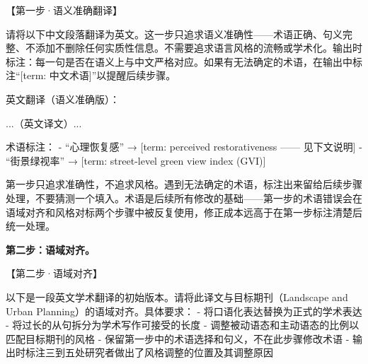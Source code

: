 \begin{userbox}
【第一步·语义准确翻译】

请将以下中文段落翻译为英文。这一步只追求语义准确性——术语正确、句义完整、不添加不删除任何实质性信息。不需要追求语言风格的流畅或学术化。输出时标注：每一句是否在语义上与中文严格对应。如果有无法确定的术语，在输出中标注``[term: 中文术语]''以提醒后续步骤。
\end{userbox}

\begin{aibox}
英文翻译（语义准确版）：

...（英文译文）...

术语标注：
- ``心理恢复感'' → [term: perceived restorativeness —— 见下文说明]
- ``街景绿视率'' → [term: street-level green view index (GVI)]
\end{aibox}

\begin{critiquebox}
第一步只追求准确性，不追求风格。遇到无法确定的术语，标注出来留给后续步骤处理，不要猜测一个填入。术语是后续所有修改的基础——第一步的术语错误会在语域对齐和风格对标两个步骤中被反复使用，修正成本远高于在第一步标注清楚后统一处理。
\end{critiquebox}

\medskip
\textbf{第二步：语域对齐。}

\begin{userbox}
【第二步·语域对齐】

以下是一段英文学术翻译的初始版本。请将此译文与目标期刊（Landscape and Urban Planning）的语域对齐。具体要求：
- 将口语化表达替换为正式的学术表达
- 将过长的从句拆分为学术写作可接受的长度
- 调整被动语态和主动语态的比例以匹配目标期刊的风格
- 保留第一步中的术语选择和句义，不在此步骤修改术语
- 输出时标注三到五处研究者做出了风格调整的位置及其调整原因
\end{userbox}

